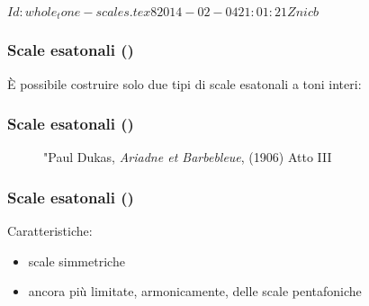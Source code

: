 %
%
\svnInfo $Id: whole_tone-scales.tex 8 2014-02-04 21:01:21Z nicb $

\setcounter{ms}{0}
\begin{frame}
    \frametitle{Scale esatonali ()}

    \`E possibile costruire solo due tipi di scale esatonali a toni interi:

    \begin{center}
        \begin{figure}
        \end{figure}
    \end{center}

\end{frame}

\begin{frame}
    \frametitle{Scale esatonali ()}

    \begin{center}
        \begin{figure}
            \caption{"Paul Dukas, \emph{Ariadne et Barbebleue}, (1906) Atto III}
        \end{figure}
    \end{center}

\end{frame}

\begin{frame}
    \frametitle{Scale esatonali ()}

    Caratteristiche:

    \begin{itemize}

        \item scale simmetriche

        \item ancora pi\`u limitate, armonicamente, delle scale pentafoniche

    \end{itemize}

\end{frame}

